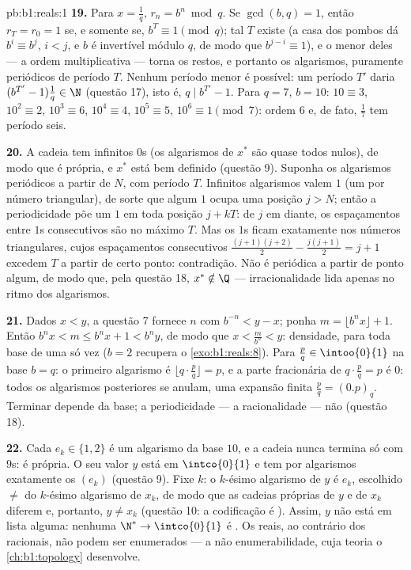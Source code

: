\begin{solution}{pb:b1:reals:1}
\textbf{19.} Para $x = \frac 1q$, $r_n = b^n \bmod q$. Se
$\gcd(b, q) = 1$, então $r_T = r_0 = 1$ se, e somente se, $b^T \equiv
1 \pmod q$; tal $T$ existe (a casa dos pombos dá $b^i \equiv b^j$,
$i < j$, e $b$ é invertível módulo $q$, de modo que $b^{j-i} \equiv
1$), e o menor deles --- a ordem multiplicativa --- torna os
restos, e portanto os algarismos, puramente periódicos de período $T$.
Nenhum período menor é possível: um período $T'$ daria $(b^{T'}
- 1)\frac1q \in \N$ (questão 17), isto é, $q \mid b^{T'} - 1$.
Para $q = 7$, $b = 10$: $10 \equiv 3$, $10^2 \equiv 2$, $10^3
\equiv 6$, $10^4 \equiv 4$, $10^5 \equiv 5$, $10^6 \equiv 1
\pmod 7$: ordem $6$ e, de fato, $\frac 17$ tem período seis.

\textbf{20.} A cadeia tem infinitos $0$s (os algarismos de $x^*$ são
quase todos nulos), de modo que é própria, e $x^*$ está bem definido
(questão 9). Suponha os algarismos periódicos a partir de $N$, com
período $T$. Infinitos algarismos valem $1$ (um por número
triangular), de sorte que algum $1$ ocupa uma posição $j > N$; então a
periodicidade põe um $1$ em toda posição $j + kT$: de $j$ em
diante, os espaçamentos entre $1$s consecutivos são no máximo $T$. Mas
os $1$s ficam exatamente nos números triangulares, cujos espaçamentos
consecutivos $\frac{(j+1)(j+2)}{2} - \frac{j(j+1)}{2} = j + 1$ excedem $T$ a partir
de certo ponto: contradição. Não é periódica a partir de ponto algum,
de modo que, pela questão 18, $x^* \notin \Q$ --- irracionalidade lida
apenas no ritmo dos algarismos.

\textbf{21.} Dados $x < y$, a questão 7 fornece $n$ com $b^{-n}
< y - x$; ponha $m = \lfloor b^n x \rfloor + 1$. Então $b^n x < m
\leq b^n x + 1 < b^n y$, de modo que $x < \frac{m}{b^n} < y$: densidade,
para toda base de uma só vez ($b = 2$ recupera o
\cref{exo:b1:reals:8}). Para $\frac pq \in \intoo{0}{1}$ na base
$b = q$: o primeiro algarismo é $\lfloor q \cdot \frac pq \rfloor =
p$, e a parte fracionária de $q \cdot \frac pq = p$ é $0$: todos
os algarismos posteriores se anulam, uma expansão finita $\frac pq =
(0.p)_q$. Terminar depende da base; a periodicidade ---
a racionalidade --- não (questão 18).

\textbf{22.} Cada $e_k \in \{1, 2\}$ é um algarismo da base $10$, e
a cadeia nunca termina só com $9$s: é própria. O seu valor $y$ está em
$\intco{0}{1}$ e tem por algarismos exatamente os $(e_k)$ (questão 9). Fixe
$k$: o $k$-ésimo algarismo de $y$ é $e_k$, escolhido $\neq$ do
$k$-ésimo algarismo de $x_k$, de modo que as cadeias próprias de $y$ e
de $x_k$ diferem e, portanto, $y \neq x_k$ (questão 10: a codificação é
). Assim, $y$ não está em lista alguma: nenhuma 
$\N^* \to \intco{0}{1}$ é . Os reais, ao contrário dos
racionais, não podem ser enumerados --- a não enumerabilidade, cuja
teoria o \cref{ch:b1:topology} desenvolve.


\end{solution}
